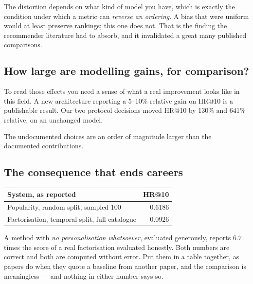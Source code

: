 \documentclass[11pt,a4paper]{article}
\begin{document}
\begin{failbox}[title={Failure condition --- so sampled metrics are not merely noisy}]
The distortion depends on what kind of model you have, which is exactly the
condition under which a metric can \emph{reverse an ordering}. A bias that were
uniform would at least preserve rankings; this one does not. That is the
finding the recommender literature had to absorb, and it invalidated a great
many published comparisons.
\end{failbox}

\subsection{How large are modelling gains, for comparison?}

To read those effects you need a sense of what a real improvement looks like in
this field. A new architecture reporting a 5--10\% relative gain on HR@10 is a
publishable result. Our two protocol decisions moved HR@10 by 130\% and 641\%
relative, on an unchanged model.

\begin{keybox}[title={The reproducibility problem, in one comparison}]
The undocumented choices are an order of magnitude larger than the documented
contributions.
\end{keybox}

\subsection{The consequence that ends careers}

\begin{center}
\small
\begin{tabular}{lr}
\toprule
\textbf{System, as reported} & \textbf{HR@10} \\
\midrule
Popularity, random split, sampled 100          & 0.6186 \\
Factorisation, temporal split, full catalogue  & 0.0926 \\
\bottomrule
\end{tabular}
\end{center}

A method with \emph{no personalisation whatsoever}, evaluated generously,
reports 6.7 times the score of a real factorisation evaluated honestly. Both
numbers are correct and both are computed without error. Put them in a table
together, as papers do when they quote a baseline from another paper, and the
comparison is meaningless --- and nothing in either number says so.
\end{document}
